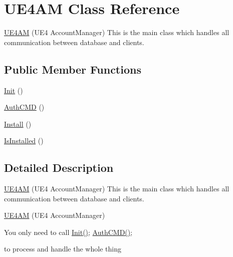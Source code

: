 \hypertarget{class_u_e4_a_m}{\section{U\-E4\-A\-M Class Reference}
\label{class_u_e4_a_m}
}


\hyperlink{class_u_e4_a_m}{U\-E4\-A\-M} (U\-E4 Account\-Manager) This is the main class which handles all communication between database and clients.  


\subsection*{Public Member Functions}
\begin{DoxyCompactItemize}
\item 
\hyperlink{class_u_e4_a_m_a8487f24bc17a5fb3c440807b12784c39}{Init} ()
\item 
\hyperlink{class_u_e4_a_m_a5ac4d50f77454d7af21c76c7a60baf2d}{Auth\-C\-M\-D} ()
\item 
\hyperlink{class_u_e4_a_m_ad44656ac65b1fdb9a3b39709c3a757f5}{Install} ()
\item 
\hyperlink{class_u_e4_a_m_aa6f5d10a7da2bcf6f31c06df2f7268fe}{Is\-Installed} ()
\end{DoxyCompactItemize}


\subsection{Detailed Description}
\hyperlink{class_u_e4_a_m}{U\-E4\-A\-M} (U\-E4 Account\-Manager) This is the main class which handles all communication between database and clients. 

\hyperlink{class_u_e4_a_m}{U\-E4\-A\-M} (U\-E4 Account\-Manager)

You only need to call \hyperlink{class_u_e4_a_m_a8487f24bc17a5fb3c440807b12784c39}{Init()}; \hyperlink{class_u_e4_a_m_a5ac4d50f77454d7af21c76c7a60baf2d}{Auth\-C\-M\-D()};

to process and handle the whole thing 

